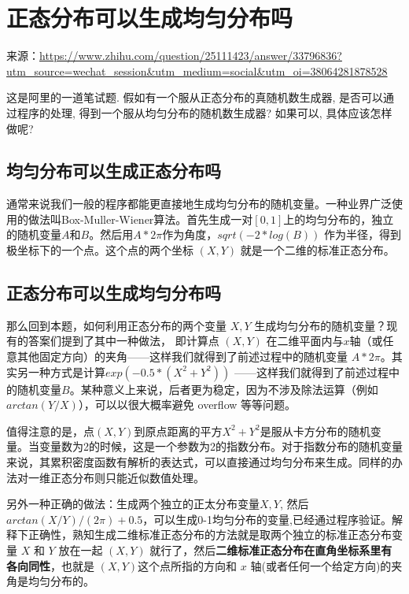 \documentclass[12pt]{article}
\begin{document}
\section{正态分布可以生成均匀分布吗}
来源：\url{https://www.zhihu.com/question/25111423/answer/33796836?utm_source=wechat_session&utm_medium=social&utm_oi=38064281878528}

这是阿里的一道笔试题. 假如有一个服从正态分布的真随机数生成器, 是否可以通过程序的处理, 得到一个服从均匀分布的随机数生成器? 如果可以, 具体应该怎样做呢? 

\subsection{均匀分布可以生成正态分布吗}
通常来说我们一般的程序都能更直接地生成均匀分布的随机变量。一种业界广泛使用的做法叫Box-Muller-Wiener算法。首先生成一对$[0,1]$上的均匀分布的，独立的随机变量$A$和$B$。然后用$A *2\pi $作为角度，$sqrt(-2*log(B))$ 作为半径，得到极坐标下的一个点。这个点的两个坐标 $(X,Y)$ 就是一个二维的标准正态分布。

\subsection{正态分布可以生成均匀分布吗}
那么回到本题，如何利用正态分布的两个变量 $X,Y$ 生成均匀分布的随机变量？现有的答案们提到了其中一种做法， 即计算点 $(X,Y)$ 在二维平面内与$x$轴（或任意其他固定方向）的夹角——这样我们就得到了前述过程中的随机变量 $A * 2\pi$。其实另一种方式是计算$exp( -0.5 * (X^2 + Y^2))$ ——这样我们就得到了前述过程中的随机变量$B$。某种意义上来说，后者更为稳定，因为不涉及除法运算（例如$arctan(Y/X)$），可以以很大概率避免 overflow 等等问题。

值得注意的是，点$(X,Y)$到原点距离的平方$X^2 + Y^2$是服从卡方分布的随机变量。当变量数为2的时候，这是一个参数为2的指数分布。对于指数分布的随机变量来说，其累积密度函数有解析的表达式，可以直接通过均匀分布来生成。同样的办法对一维正态分布则只能近似数值处理。

另外一种正确的做法：生成两个独立的正太分布变量$X,Y$, 然后$arctan(X/Y)/(2\pi)+0.5$，可以生成0-1均匀分布的变量,已经通过程序验证。解释下正确性，熟知生成二维标准正态分布的方法就是取两个独立的标准正态分布变量 $X$ 和 $Y$ 放在一起 $(X, Y)$ 就行了，然后\textbf{二维标准正态分布在直角坐标系里有各向同性}，也就是 $(X, Y)$这个点所指的方向和 $x$ 轴(或者任何一个给定方向)的夹角是均匀分布的。




\end{document}
